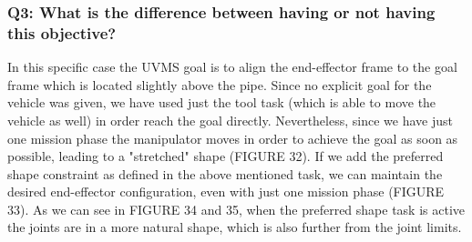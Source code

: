 \documentclass{article}
\begin{document}
\subsubsection{Q3: What is the difference between having or not having this objective?} %
In this specific case the UVMS goal is to align the end-effector frame to the goal frame which is located slightly above the pipe. Since no explicit goal for the vehicle was given, we have used just the tool task (which is able to move the vehicle as well) in order reach the goal directly. Nevertheless, since we have just one mission phase the manipulator moves in order to achieve the goal as soon as possible, leading to a "stretched" shape (FIGURE 32). If we add the preferred shape constraint as defined in the above mentioned task, we can maintain the desired end-effector configuration, even with just one mission phase (FIGURE 33). As we can see in FIGURE 34 and 35, when the preferred shape task is active the joints are in a more natural shape, which is also further from the joint limits.
\end{document}
